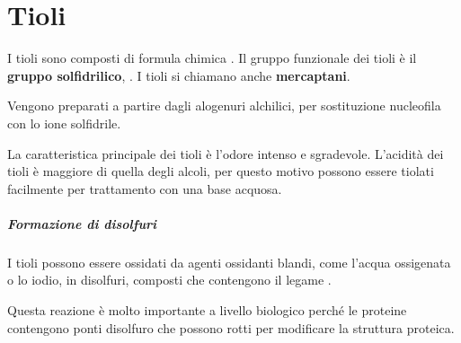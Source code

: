\chapter{Tioli}
I tioli sono composti di formula chimica . Il gruppo funzionale dei tioli è il \textbf{gruppo solfidrilico}, . I tioli si chiamano anche \textbf{mercaptani}.

Vengono preparati a partire dagli alogenuri alchilici, per sostituzione nucleofila con lo ione solfidrile.

\begin{reaction}
	 \+  \arrow {} \+ 
\end{reaction}

La caratteristica principale dei tioli è l'odore intenso e sgradevole. L'acidità dei tioli è maggiore di quella degli alcoli, per questo motivo possono essere tiolati facilmente per trattamento con una base acquosa.

\begin{reaction}
\end{reaction}

\paragraph{Formazione di disolfuri}\label{par:disolfuri}
I tioli possono essere ossidati da agenti ossidanti blandi, come l'acqua ossigenata o lo iodio, in disolfuri, composti che contengono il legame .

\begin{reaction}
\end{reaction}

Questa reazione è molto importante a livello biologico perché le proteine contengono ponti disolfuro che possono rotti per modificare la struttura proteica.